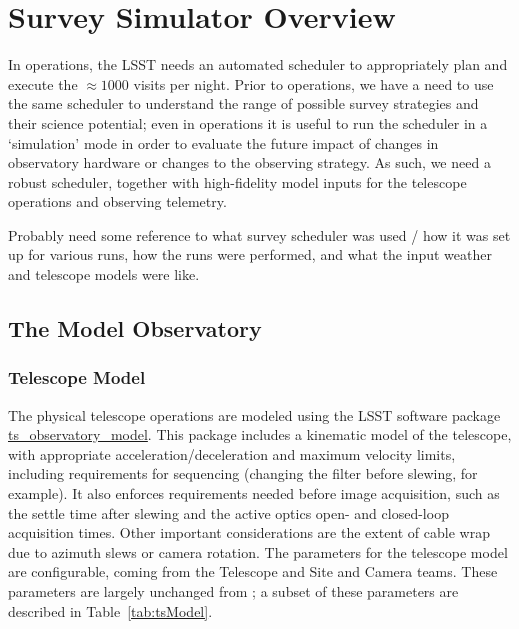 

\section{Survey Simulator Overview}
\label{section:simulator}

In operations, the LSST needs an automated scheduler to appropriately plan and execute the $\approx1000$ visits per night. Prior to operations, we have a need to use the same scheduler to understand the range of possible survey strategies and their science potential; even in operations it is useful to run the scheduler in a `simulation' mode in order to evaluate the future impact of changes in observatory hardware or changes to the observing strategy. As such, we need a robust scheduler, together with high-fidelity model inputs for the telescope operations and observing telemetry.  

Probably need some reference to what survey scheduler was used / how it was set up for various runs, how the runs were performed, and what the input weather and telescope models were like. 

\subsection{The Model Observatory}


\subsubsection{Telescope Model}

The physical telescope operations are modeled using the LSST software package \href{https://github.com/lsst-ts/ts_observatory_model}{ts\_observatory\_model}. This package includes a kinematic model of the telescope, with appropriate acceleration/deceleration and maximum velocity limits, including requirements for sequencing (changing the filter before slewing, for example). It also enforces requirements needed before image acquisition, such as the settle time after slewing and the active optics open- and closed-loop acquisition times. Other important considerations are the extent of cable wrap due to azimuth slews or camera rotation. The parameters for the telescope model are configurable, coming from the Telescope and Site and Camera teams. These parameters are largely unchanged from \citet{Delgado14}; a subset of these parameters are described in Table~\ref{tab:tsModel}. 

